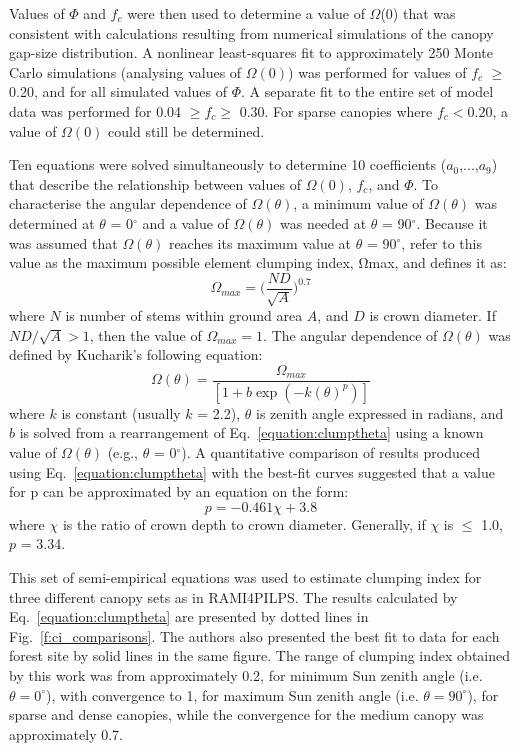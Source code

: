 Values of $\Phi$ and $f_c$ were then used to determine a value of $\Omega$(0) that was consistent with calculations resulting from numerical simulations of the canopy gap-size distribution. A nonlinear least-squares fit to approximately 250 Monte Carlo simulations (analysing values of $\Omega(0)$) was performed for values of $f_c$ $\geq$ 0.20, and for all simulated values of $\Phi$. A separate fit to the entire set of model data was performed for 0.04 $\geq f_c \geq$ 0.30. For sparse canopies where $f_c < 0.20$, a value of $\Omega(0)$ could still be determined. 

Ten equations were solved simultaneously to determine 10 coefficients ($a_0$,...,$a_9$) that describe the relationship between values of $\Omega(0)$, $f_c$, and $\Phi$. To characterise the angular dependence of $\Omega(\theta)$, a minimum value of $\Omega(\theta)$ was determined at $\theta$ = 0$^{\circ}$ and a value of $\Omega(\theta)$ was needed at $\theta$ = 90$^{\circ}$. Because it was assumed that $\Omega(\theta)$ reaches its maximum value at $\theta$ = 90$^{\circ}$, \citet{Kucharik1999} refer to this value as the maximum possible element clumping index, Ωmax, and defines it as:
\begin{equation}
\Omega_{max} = \Big(\frac{ND}{\sqrt{A}}\Big)^{0.7}
\label{equation:clumpmax}
\end{equation}
\noindent where $N$ is number of stems within ground area $A$, and $D$ is crown diameter. If $ND/\sqrt{A} > 1$, then the value of $\Omega_{max} = 1$. The angular dependence of $\Omega(\theta)$ was defined by Kucharik’s following equation: 
\begin{equation}
\Omega(\theta) = \frac{\Omega_{max}}{[1 + b\exp(-k(\theta)^p)]}
\label{equation:clumptheta}
\end{equation}
\noindent where $k$ is constant (usually $k$ = 2.2), $\theta$ is zenith angle expressed in radians, and $b$ is solved from a rearrangement of Eq.~\ref{equation:clumptheta} using a known value of $\Omega(\theta)$ (e.g., $\theta$ = 0$^{\circ}$). A quantitative comparison of results produced using Eq.~\ref{equation:clumptheta} with the best-fit curves suggested that a value for p can be approximated by an equation on the form:
\begin{equation}
p = -0.461\chi + 3.8
\label{equation:pchi}
\end{equation}
\noindent where $\chi$ is the ratio of crown depth to crown diameter. Generally, if $\chi$ is $\leq$ 1.0, $p$ = 3.34. 

This set of semi-empirical equations was used to estimate clumping index for three different canopy sets as in RAMI4PILPS. The results calculated by Eq.~\ref{equation:clumptheta} are presented by dotted lines in Fig.~\ref{f:ci_comparisons}. The authors also presented the best fit to data for each forest site by solid lines in the same figure. The range of clumping index obtained by this work was from approximately 0.2, for minimum Sun zenith angle (i.e. $\theta = 0^{\circ}$), with convergence to 1, for maximum Sun zenith angle (i.e. $\theta = 90^{\circ}$), for sparse and dense canopies, while the convergence for the medium canopy was approximately 0.7.

